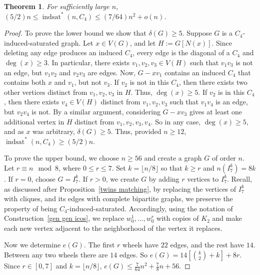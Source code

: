 \documentclass[12pt]{amsart}
\theoremstyle{plain}
\newtheorem{thm}{Theorem}[section]
\theoremstyle{definition}
\theoremstyle{remark}
\newcommand{\sis}[2]{\ensuremath{{\operatorname{indsat}}^*(#1,#2)}\xspace}
\begin{document}
\begin{thm}\label{prop:C4}
For sufficiently large $n$, $(5/2)n \leq \sis{n}{C_4}\leq (7/64)n^2+o(n)$.
\end{thm}
\begin{proof}
To prove the lower bound we show that $\delta(G) \ge 5$.
Suppose $G$ is a $C_4$-induced-saturated graph.
Let $x \in V(G)$, and let $H:=G[N(x)]$.  Since deleting any edge produces an induced $C_4$, every edge is the diagonal of a $C_4$ and $\deg(x) \ge 3$.  In particular, there exists $v_1,v_2,v_3 \in V(H)$ such that $v_1v_3$ is not an edge, but $v_1v_2$ and $v_2v_3$ are edges.  Now, $G - xv_1$ contains an induced $C_4$ that contains both $x$ and $v_1$, but not $v_3$.  If $v_2$ is not in this $C_4$, then there exists two other vertices distinct from $v_1,v_2,v_3$ in $H$.  Thus, $\deg(x) \ge 5$.  If $v_2$ is in this $C_4$, then there exists $v_4 \in V(H)$  distinct from $v_1,v_2,v_3$ such that $v_1v_4$ is an edge, but $v_2v_4$ is not.  By a similar argument, considering $G - xv_3$ gives at least one additional vertex in $H$ distinct from $v_1,v_2,v_3,v_4$.  So in any case, $\deg(x) \ge 5$, and as $x$ was arbitrary, $\delta(G) \ge 5$.  Thus, provided $n \ge 12$, $\sis{n}{C_4} \ge (5/2)n$.



To prove the upper bound, we choose $n \geq 56$ and create a graph $G$ of order $n$. Let $r \equiv n \mod 8$, where $0 \le r \le 7$.  Set $k=\lfloor n/8 \rfloor$ so that $k \ge r$ and $n(I_7^k)=8k$.  If $r=0$, choose $G=I_7^k$. If $r>0$, we create $G$ by adding $r$ vertices to $I_7^k$. Recall, as discussed after Proposition~\ref{twins matching},
by replacing the vertices of $I_7^k$ with cliques, and its edges with complete bipartite graphs,
we preserve the property of being $C_4$-induced-saturated.
Accordingly, using the notation of Construction~\ref{gen gen icos}, we replace $w_0^1,\ldots, w_0^r$ with copies of $K_2$ and make each new vertex adjacent to the neighborhood of the vertex it replaces.

Now we determine $e(G)$. The first $r$ wheels have $22$ edges, and the rest have $14$. Between any two wheels there are $14$ edges. So $e(G)=14\left[{k \choose 2}+k\right]+8r$. Since
$r \in [0,7]$ and $k=\lfloor n/8 \rfloor$, $e(G) \leq \frac{7}{64}n^2+\frac{7}{8}n+56$.


\end{proof}
\end{document}
